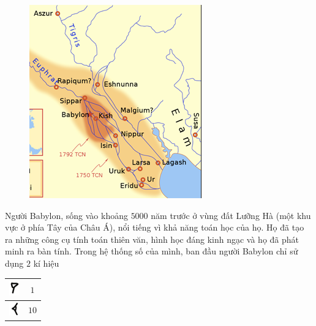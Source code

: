 	\begin{figure}
		\centering
		\vspace*{-15pt}
		\captionsetup{labelformat= empty, justification=centering}
		\includegraphics[width=1\linewidth]{17.1}
		\vspace*{-30pt}
	\end{figure}
	Người Babylon, sống vào khoảng $5000$ năm trước ở vùng đất Lưỡng Hà (một khu vực ở phía Tây của  Châu Á), nổi tiếng vì khả năng toán học của họ. Họ đã tạo ra những công cụ tính toán thiên văn, hình học đáng kinh ngạc và họ đã phát minh ra bàn tính.
	\vskip 0.1cm
	Trong hệ thống số của mình, ban đầu người Babylon chỉ sử dụng $2$ kí hiệu 
	\begin{table}[H]
		\vspace*{-5pt}
		\centering
		\begin{tabular}{|c|c|}
			\hline
			\includegraphics[scale=0.7]{15}&$1$\\
			\hline
			\includegraphics[scale=0.65]{16}&$10$\\
			\hline
		\end{tabular}
		\vspace*{-5pt}
	\end{table}
